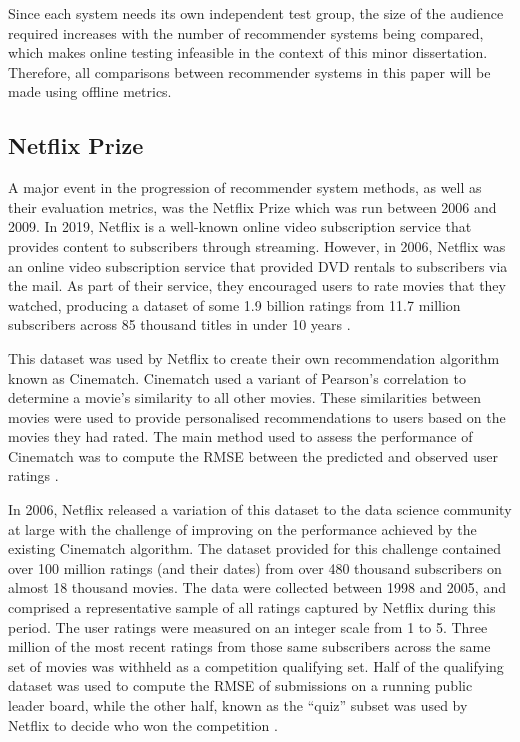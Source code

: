 Since each system needs its own independent test group, the size of the audience required increases with the number of recommender systems being compared, which makes online testing infeasible in the context of this minor dissertation. Therefore, all comparisons between recommender systems in this paper will be made using offline metrics.

\subsection{Netflix Prize}
A major event in the progression of recommender system methods, as well as their evaluation metrics, was the Netflix Prize which was run between 2006 and 2009. In 2019, Netflix is a well-known online video subscription service that provides content to subscribers through streaming. However, in 2006, Netflix was an online video subscription service that provided DVD rentals to subscribers via the mail. As part of their service, they encouraged users to rate movies that they watched, producing a dataset of some 1.9 billion ratings from 11.7 million subscribers across 85 thousand titles in under 10 years \parencite{netflix_description}.

This dataset was used by Netflix to create their own recommendation algorithm known as Cinematch. Cinematch used a variant of Pearson's correlation to determine a movie's similarity to all other movies. These similarities between movies were used to provide personalised recommendations to users based on the movies they had rated. The main method used to assess the performance of Cinematch was to compute the RMSE between the predicted and observed user ratings \parencite{netflix_description}.

In 2006, Netflix released a variation of this dataset to the data science community at large with the challenge of improving on the performance achieved by the existing Cinematch algorithm. The dataset provided for this challenge contained over 100 million ratings (and their dates) from over 480 thousand subscribers on almost 18 thousand movies. The data were collected between 1998 and 2005, and comprised a representative sample of all ratings captured by Netflix during this period. The user ratings were measured on an integer scale from 1 to 5. Three million of the most recent ratings from those same subscribers across the same set of movies was withheld as a competition qualifying set. Half of the qualifying dataset was used to compute the RMSE of submissions on a running public leader board, while the other half, known as the ``quiz'' subset was used by Netflix to decide who won the competition \parencite{netflix_description}.

